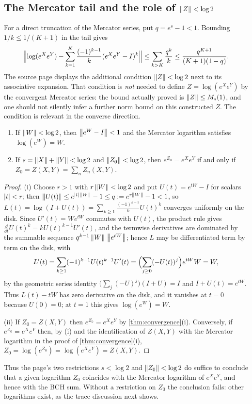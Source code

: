 \subsection{The Mercator tail and the role of \texorpdfstring{$\left\lVert Z\right\rVert<\log2$}{||Z||<log 2}}
For a direct truncation of the Mercator series, put $q=e^s-1<1$. Bounding
$1/k\leq1/(K+1)$ in the tail gives
\begin{equation}\label{eq:mercatortail}
 \Bigl\|\log(e^Xe^Y)-\sum_{k=1}^K\frac{(-1)^{k-1}}{k}(e^Xe^Y-I)^k\Bigr\|
 \leq\sum_{k>K}\frac{q^k}{k}\leq\frac{q^{K+1}}{(K+1)(1-q)}.
\end{equation}
The source page displays the additional condition $\left\lVert Z\right\rVert<\log2$ next to
its associative expansion. That condition is \emph{not} needed to define
$Z=\log(e^Xe^Y)$ by the convergent Mercator series: the bound actually
proved is $\left\lVert Z\right\rVert\leq M_s(1)$, and one should not silently infer a
further norm bound on this constructed $Z$. The condition is relevant in
the converse direction.
\begin{proposition}\label{prop:uniquelog}
\begin{enumerate}[label=(\roman*)]
\item If $\left\lVert W\right\rVert<\log2$, then $\left\lVert e^W-I\right\rVert<1$ and the Mercator logarithm
satisfies $\log(e^W)=W$.
\item If $s=\left\lVert X\right\rVert+\left\lVert Y\right\rVert<\log2$ and $\left\lVert Z_0\right\rVert<\log2$, then
$e^{Z_0}=e^Xe^Y$ if and only if $Z_0=Z(X,Y)=\sum_nZ_n(X,Y)$.
\end{enumerate}
\end{proposition}
\begin{proof}
(i) Choose $r>1$ with $r\left\lVert W\right\rVert<\log2$ and put $U(t)=e^{tW}-I$ for scalars
$|t|<r$; then $\left\lVert U(t)\right\rVert\leq e^{|t|\left\lVert W\right\rVert}-1\leq q:=e^{r\left\lVert W\right\rVert}-1<1$,
so $L(t)=\log(I+U(t))=\sum_{k\geq1}\frac{(-1)^{k-1}}{k}U(t)^k$ converges
uniformly on the disk. Since $U'(t)=We^{tW}$ commutes with $U(t)$, the
product rule gives $\frac{\dd}{\dd t}U(t)^k=kU(t)^{k-1}U'(t)$, and the
termwise derivatives are dominated by the summable sequence
$q^{k-1}\left\lVert W\right\rVert\,\left\lVert e^{tW}\right\rVert$; hence $L$ may be differentiated term by term
on the disk, with
\[
 L'(t)=\sum_{k\geq1}(-1)^{k-1}U(t)^{k-1}U'(t)
 =\Bigl(\sum_{j\geq0}(-U(t))^{j}\Bigr)e^{tW}W=W,
\]
by the geometric series identity $\bigl(\sum_j(-U)^j\bigr)(I+U)=I$ and
$I+U(t)=e^{tW}$. Thus $L(t)-tW$ has zero derivative on the disk, and it
vanishes at $t=0$ because $U(0)=0$; at $t=1$ this gives $\log(e^W)=W$.

(ii) If $Z_0=Z(X,Y)$ then $e^{Z_0}=e^Xe^Y$ by \cref{thm:convergence}(i).
Conversely, if $e^{Z_0}=e^Xe^Y$ then, by (i) and the identification of
$Z(X,Y)$ with the Mercator logarithm in the proof of
\cref{thm:convergence}(i), $Z_0=\log(e^{Z_0})=\log(e^Xe^Y)=Z(X,Y)$.
\end{proof}
Thus the page's two restrictions $s<\log2$ and $\left\lVert Z_0\right\rVert<\log2$ do
suffice to conclude that a given logarithm $Z_0$ coincides with the
Mercator logarithm of $e^Xe^Y$, and hence with the BCH sum. Without a
restriction on $Z_0$ the conclusion fails: other logarithms exist, as
the trace discussion next shows.

